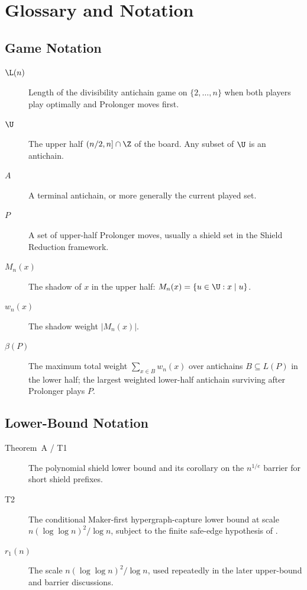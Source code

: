 \section{Glossary and Notation}\label{app:glossary}

\subsection{Game Notation}

\begin{description}
  \item[$\L(n)$] Length of the divisibility antichain game on $\{2,\dots,n\}$
  when both players play optimally and Prolonger moves first.
  \item[$\U$] The upper half $(n/2,n]\cap \Z$ of the board.  Any subset
  of $\U$ is an antichain.
  \item[$A$] A terminal antichain, or more generally the current played set.
  \item[$P$] A set of upper-half Prolonger moves, usually a shield set in the
  Shield Reduction framework.
  \item[$M_n(x)$] The shadow of $x$ in the upper half:
  $M_n(x)=\{u\in \U: x\mid u\}$.
  \item[$w_n(x)$] The shadow weight $|M_n(x)|$.
  \item[$\beta(P)$] The maximum total weight $\sum_{x\in B}w_n(x)$ over antichains
  $B\subseteq L(P)$ in the lower half; the largest weighted lower-half antichain
  surviving after Prolonger plays $P$.
\end{description}

\subsection{Lower-Bound Notation}

\begin{description}
  \item[Theorem~A / T1] The polynomial shield lower bound and its corollary on
  the $n^{1/e}$ barrier for short shield prefixes.
  \item[T2] The conditional Maker-first hypergraph-capture lower bound at
  scale $n(\log\log n)^2/\log n$, subject to the finite safe-edge hypothesis
  of .
  \item[$r_1(n)$] The scale $n(\log\log n)^2/\log n$, used repeatedly in the
  later upper-bound and barrier discussions.
\end{description}

